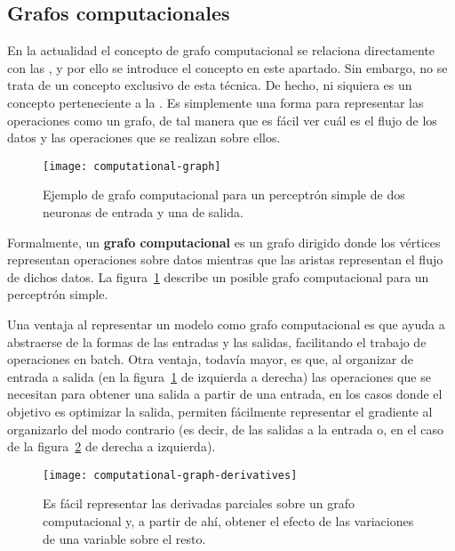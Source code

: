 \subsection{Grafos computacionales}

En la actualidad el concepto de grafo computacional se relaciona directamente con las , y por ello se introduce el concepto en este apartado. Sin embargo, no se trata de un concepto exclusivo de esta técnica. De hecho, ni siquiera es un concepto perteneciente a la . Es simplemente una forma para representar las operaciones como un grafo, de tal manera que es fácil ver cuál es el flujo de los datos y las operaciones que se realizan sobre ellos.

\begin{figure}
	\centering
	\texttt{[image: computational-graph]}
	\caption[Ejemplo de grafo computacional]{Ejemplo de grafo computacional para un perceptrón simple de dos neuronas de entrada y una de salida.}
	\label{fig:computational-graph}
\end{figure}

Formalmente, un \textbf{grafo computacional} es un grafo dirigido donde los vértices representan operaciones sobre datos mientras que las aristas representan el flujo de dichos datos. La figura~\ref{fig:computational-graph} describe un posible grafo computacional para un perceptrón simple.

Una ventaja al representar un modelo como grafo computacional es que ayuda a abstraerse de la formas de las entradas y las salidas, facilitando el trabajo de operaciones en batch. Otra ventaja, todavía mayor, es que, al organizar de entrada a salida (en la figura~\ref{fig:computational-graph} de izquierda a derecha) las operaciones que se necesitan para obtener una salida a partir de una entrada, en los casos donde el objetivo es optimizar la salida, permiten fácilmente representar el gradiente al organizarlo del modo contrario (es decir, de las salidas a la entrada o, en el caso de la figura~\ref{fig:computational-graph-derivatives} de derecha a izquierda).

\begin{figure}
	\centering
	\texttt{[image: computational-graph-derivatives]}
	\caption[Derivadas parciales sobre un grafo computacional]{Es fácil representar las derivadas parciales sobre un grafo computacional y, a partir de ahí, obtener el efecto de las variaciones de una variable sobre el resto.}
	\label{fig:computational-graph-derivatives}
\end{figure}


